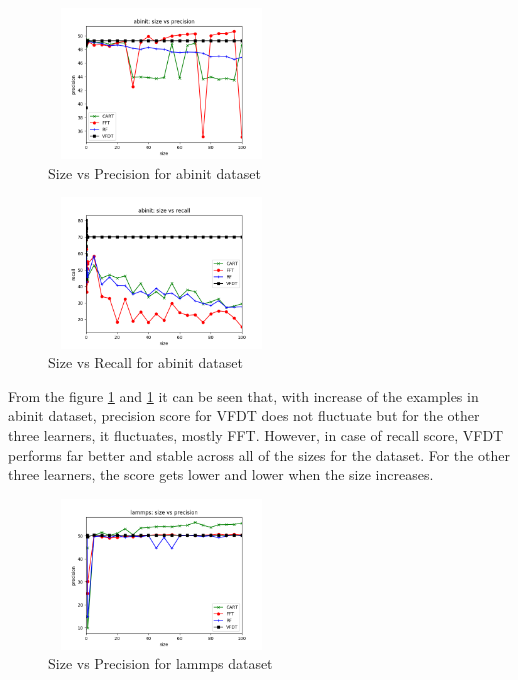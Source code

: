 \documentclass[sigplan]{acmart}\settopmatter{printfolios=true,printccs=false,printacmref=false}
\begin{document}
\begin{figure}[h]
	\includegraphics[width=6cm,height=4cm,keepaspectratio]{fig/abinit-size-precision.png}
	\caption{Size vs Precision for abinit dataset}
	\label{fig:ab-size-prec}
\end{figure}

\begin{figure}[h]
	\includegraphics[width=6cm,height=4cm,keepaspectratio]{fig/abinit-size-recall.png}
	\caption{Size vs Recall for abinit dataset}
	\label{fig:ab-size-rec}
\end{figure}

From the figure \ref{fig:ab-size-prec} and \ref{fig:ab-size-prec} it can be seen that, with increase of the examples in abinit dataset, precision score for VFDT does not fluctuate but for the other three learners, it fluctuates, mostly FFT. However, in case of recall score, VFDT performs far better and stable across all of the sizes for the dataset. For the other three learners, the score gets lower and lower when the size increases. 

\begin{figure}[h]
	\includegraphics[width=6cm,height=4cm,keepaspectratio]{fig/lammps-size-precision.png}
	\caption{Size vs Precision for lammps dataset}
	\label{fig:lm-size-prec}
\end{figure}
\end{document}

